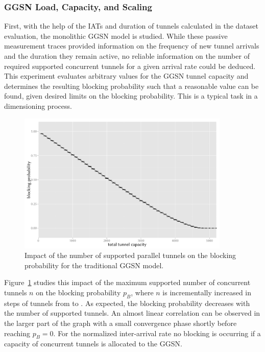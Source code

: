 \subsubsection{GGSN Load, Capacity, and Scaling}

First, with the help of the \glspl{IAT} and duration of tunnels calculated in the dataset evaluation, the monolithic \gls{GGSN} model is studied. While these passive measurement traces provided information on the frequency of new tunnel arrivals and the duration they remain active, no reliable information on the number of required supported concurrent tunnels for a given arrival rate could be deduced. 
This experiment evaluates arbitrary values for the \gls{GGSN} tunnel capacity and determines the resulting blocking probability such that a reasonable value can be found, given desired limits on the blocking probability. This is a typical task in a dimensioning process.

\begin{figure}[htb]
	\centering
	\includegraphics[width=0.9\textwidth]{images/R-monolithic-blocking.pdf}
	\caption{Impact of the number of supported parallel tunnels on the blocking probability for the traditional \acrshort{GGSN} model.}
\label{c4:fig:traditional_blocking}
\end{figure}

Figure~\ref{c4:fig:traditional_blocking} studies this impact of the maximum supported number of concurrent tunnels $n$ on the blocking probability $p_B$, where $n$ is incrementally increased in steps of  tunnels from  to . As expected, the blocking probability decreases with the number of supported tunnels. An almost linear correlation can be observed in the larger part of the graph with a small convergence phase shortly before reaching $p_B=0$. For the normalized inter-arrival rate no blocking is occurring if a capacity of  concurrent tunnels is allocated to the \gls{GGSN}.


